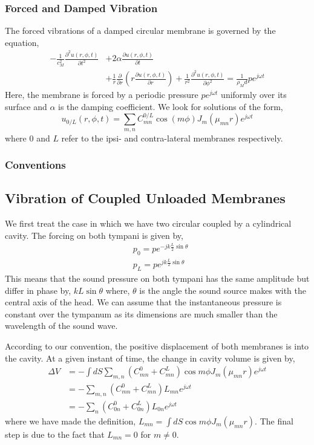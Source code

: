 \documentclass[a4paper,10pt]{article}
\begin{document}
\subsubsection{Forced and Damped Vibration}
The forced vibrations of a damped circular membrane is governed by the equation,
\begin{align}\label{ForcedMembrane}
-\frac{1}{c_M^2}\frac{\partial^2u(r,\phi,t)}{\partial t^2}&+2\alpha\frac{\partial u(r,\phi,t)}{\partial t}\nonumber\\
&+\frac{1}{r}\frac{\partial}{\partial r}\left(r\frac{\partial u(r,\phi,t)}{\partial r}\right)+\frac{1}{r^2}\frac{\partial^2 u(r,\phi,t)}{\partial \phi^2}=\frac{1}{\rho_Md}pe^{j\omega t}
\end{align}
Here, the membrane is forced by a periodic pressure $pe^{j\omega t}$ uniformly over its surface and $\alpha$ is
the damping coefficient. We look for solutions of the form,
\begin{equation}\label{forcedmembranegeneral}
 u_{0/L}(r,\phi,t)=\sum_{m,n}C^{0/L}_{mn}\cos(m\phi)J_m(\mu_{mn}r)e^{j\omega t}
\end{equation}
where $0$ and $L$ refer to the ipsi- and contra-lateral membranes respectively.
\subsubsection{Conventions}

\subsection{Vibration of Coupled Unloaded Membranes}
We first treat the case in which we have two circular coupled by a cylindrical cavity. The forcing
on both tympani is given by,
\begin{align}
 &p_0=pe^{-jk\frac{L}{2}\sin\theta}\\
 &p_L=pe^{jk\frac{L}{2}\sin\theta}
\end{align}
This means that the sound pressure on both tympani has the same amplitude but differ in phase by, $kL\sin\theta$ where,
$\theta$ is the angle the sound source makes with the central axis of the head. We can assume that
the instantaneous pressure is constant over the tympanum as its dimensions are much smaller than 
the wavelength of the sound wave.

According to our convention, the positive displacement of both membranes is into the cavity. 
At a given instant of time, the change in cavity volume is given by,
\begin{align}
 \Delta V&=-\int dS \sum_{m,n}\left(C^0_{mn}+C^L_{mn}\right)\cos m\phi J_m(\mu_{mn}r)e^{j\omega t}\nonumber\\
 &=-\sum_{m,n}\left(C^0_{mn}+C^L_{mn}\right)L_{mn}e^{j\omega t}\nonumber\\
 &=-\sum_{n}\left(C^0_{0n}+C^L_{0n}\right)L_{0n}e^{j\omega t}\label{CavitydV}
\end{align}
where we have made the definition, $L_{mn}=\int dS\cos m\phi J_m(\mu_{mn}r)$. The final step is
due to the fact that $L_{mn}=0$ for $m\neq 0$.
\end{document}

